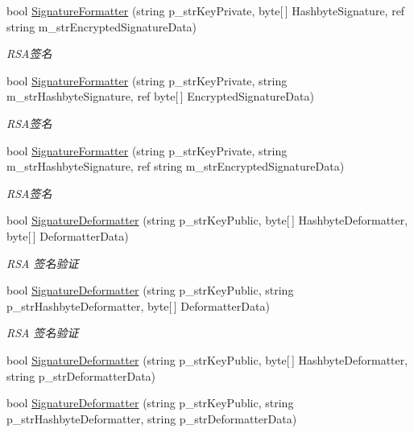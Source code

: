 \begin{DoxyCompactItemize}
bool \hyperlink{class_x_c_l_net_tools_1_1_encrypt_1_1_r_s_a_cryption_a3a0b1d6ee93b6d95c9e69d67d5c5533e}{Signature\-Formatter} (string p\-\_\-str\-Key\-Private, byte\mbox{[}$\,$\mbox{]} Hashbyte\-Signature, ref string m\-\_\-str\-Encrypted\-Signature\-Data)
\begin{DoxyCompactList}\small\item\em R\-S\-A签名 \end{DoxyCompactList}\item 
bool \hyperlink{class_x_c_l_net_tools_1_1_encrypt_1_1_r_s_a_cryption_a2f3db195746c791b85d4706c99a17a31}{Signature\-Formatter} (string p\-\_\-str\-Key\-Private, string m\-\_\-str\-Hashbyte\-Signature, ref byte\mbox{[}$\,$\mbox{]} Encrypted\-Signature\-Data)
\begin{DoxyCompactList}\small\item\em R\-S\-A签名 \end{DoxyCompactList}\item 
bool \hyperlink{class_x_c_l_net_tools_1_1_encrypt_1_1_r_s_a_cryption_a7f010e16f780f80fd0d702c2f6bd7af2}{Signature\-Formatter} (string p\-\_\-str\-Key\-Private, string m\-\_\-str\-Hashbyte\-Signature, ref string m\-\_\-str\-Encrypted\-Signature\-Data)
\begin{DoxyCompactList}\small\item\em R\-S\-A签名 \end{DoxyCompactList}\item 
bool \hyperlink{class_x_c_l_net_tools_1_1_encrypt_1_1_r_s_a_cryption_a606d12a176fff58b86237d16f211ed85}{Signature\-Deformatter} (string p\-\_\-str\-Key\-Public, byte\mbox{[}$\,$\mbox{]} Hashbyte\-Deformatter, byte\mbox{[}$\,$\mbox{]} Deformatter\-Data)
\begin{DoxyCompactList}\small\item\em R\-S\-A 签名验证 \end{DoxyCompactList}\item 
bool \hyperlink{class_x_c_l_net_tools_1_1_encrypt_1_1_r_s_a_cryption_af7392c6aa1d24546bae3e564e817c5f5}{Signature\-Deformatter} (string p\-\_\-str\-Key\-Public, string p\-\_\-str\-Hashbyte\-Deformatter, byte\mbox{[}$\,$\mbox{]} Deformatter\-Data)
\begin{DoxyCompactList}\small\item\em R\-S\-A 签名验证 \end{DoxyCompactList}\item 
bool \hyperlink{class_x_c_l_net_tools_1_1_encrypt_1_1_r_s_a_cryption_af6e8cbf3d5f51120ee913bb7fc9c810d}{Signature\-Deformatter} (string p\-\_\-str\-Key\-Public, byte\mbox{[}$\,$\mbox{]} Hashbyte\-Deformatter, string p\-\_\-str\-Deformatter\-Data)
\item 
bool \hyperlink{class_x_c_l_net_tools_1_1_encrypt_1_1_r_s_a_cryption_a063bdecbb1d58871f898f1cc71ad7572}{Signature\-Deformatter} (string p\-\_\-str\-Key\-Public, string p\-\_\-str\-Hashbyte\-Deformatter, string p\-\_\-str\-Deformatter\-Data)
\end{DoxyCompactItemize}


